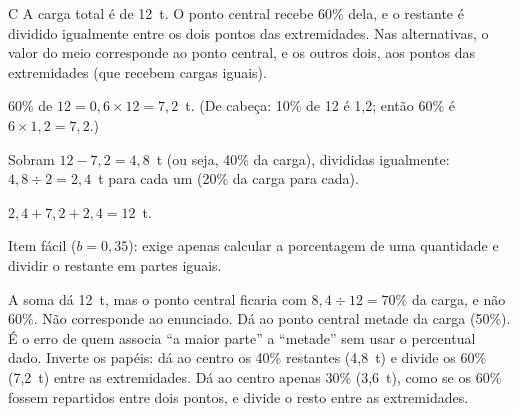 \secaoenem

\begin{resolucao}{C}
 A carga total é de 12~t. O ponto central
recebe 60\% dela, e o restante é dividido igualmente entre os dois pontos das
extremidades. Nas alternativas, o valor do meio corresponde ao ponto central, e os
outros dois, aos pontos das extremidades (que recebem cargas iguais).

 $60\%$ de $12 = 0{,}6\times 12 = 7{,}2$~t. (De cabeça:
10\% de 12 é 1,2; então 60\% é $6\times 1{,}2 = 7{,}2$.)

 Sobram $12 - 7{,}2 = 4{,}8$~t (ou seja, 40\% da
carga), divididas igualmente: $4{,}8 \div 2 = 2{,}4$~t para cada um (20\% da carga
para cada).

 $2{,}4 + 7{,}2 + 2{,}4 = 12$~t.


Item fácil ($b = 0{,}35$): exige apenas calcular a porcentagem de uma quantidade
e dividir o restante em partes iguais.
\begin{distratores}
 A soma dá 12~t, mas o ponto central ficaria com $8{,}4 \div 12 = 70\%$ da
carga, e não 60\%. Não corresponde ao enunciado.
 Dá ao ponto central metade da carga (50\%). É o erro de quem associa
``a maior parte'' a ``metade'' sem usar o percentual dado.
 Inverte os papéis: dá ao centro os 40\% restantes (4,8~t) e divide os
60\% (7,2~t) entre as extremidades.
 Dá ao centro apenas 30\% (3,6~t), como se os 60\% fossem repartidos
entre dois pontos, e divide o resto entre as extremidades.
\end{distratores}
\end{resolucao}


